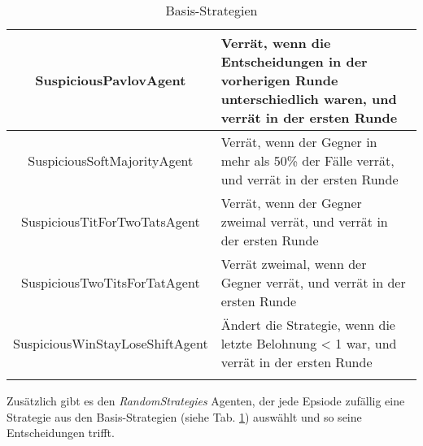 \begin{longtable}{|c|m{7cm}|}
    \hline
    SuspiciousPavlovAgent & Verrät, wenn die Entscheidungen in der vorherigen Runde unterschiedlich waren, und verrät in der ersten Runde \\
    \hline
    SuspiciousSoftMajorityAgent & Verrät, wenn der Gegner in mehr als 50\% der Fälle verrät, und verrät in der ersten Runde \\
    \hline
    SuspiciousTitForTwoTatsAgent & Verrät, wenn der Gegner zweimal verrät, und verrät in der ersten Runde \\
    \hline
    SuspiciousTwoTitsForTatAgent & Verrät zweimal, wenn der Gegner verrät, und verrät in der ersten Runde \\
    \hline
    SuspiciousWinStayLoseShiftAgent & Ändert die Strategie, wenn die letzte Belohnung < 1 war, und verrät in der ersten Runde \\
    \hline
\caption{Basis-Strategien}
\label{table:basestrategies}
\end{longtable}
Zusätzlich gibt es den \textit{RandomStrategies} Agenten, der jede Epsiode  zufällig  eine Strategie aus den 
Basis-Strategien (siehe Tab. \ref{table:basestrategies}) auswählt und so seine
Entscheidungen trifft. \\

